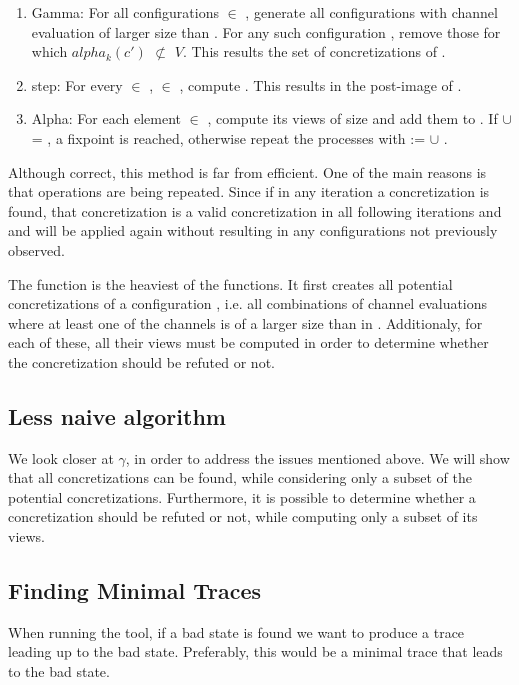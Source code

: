 \begin{enumerate}
\item
Gamma: For all configurations  $\in$ , generate all configurations with channel evaluation of larger size than . For any such configuration , remove those for which $alpha_k(c')$ $\not\subset$ $V$. This results the set of concretizations  of .

\item
step: For every  $\in$ ,  $\in$ , compute . This results in the post-image  of .

\item
Alpha: For each element  $\in$ , compute its views of size  and add them to . If  $\cup$  = , a fixpoint is reached, otherwise repeat the processes with  :=  $\cup$ .
\end{enumerate}

Although correct, this method is far from efficient. One of the main reasons is that operations are being repeated. Since if in any iteration a concretization is found, that concretization is a valid concretization in all following iterations and  and  will be applied again without resulting in any configurations not previously observed.

The function  is the heaviest of the functions. It first creates all potential concretizations of a configuration , i.e. all combinations of channel evaluations where at least one of the channels is of a larger size than in . Additionaly, for each of these, all their views must be computed in order to determine whether the concretization should be refuted or not.

\subsection{Less naive algorithm}
We look closer at $\gamma$, in order to address the issues mentioned above. We will show that all concretizations can be found, while considering only a subset of the potential concretizations. Furthermore, it is possible to determine whether a concretization should be refuted or not, while computing only a subset of its views. 


\subsection{Finding Minimal Traces}
When running the tool, if a bad state is found we want to produce a trace leading up to the bad state. Preferably, this would be a minimal trace that leads to the bad state.
 
